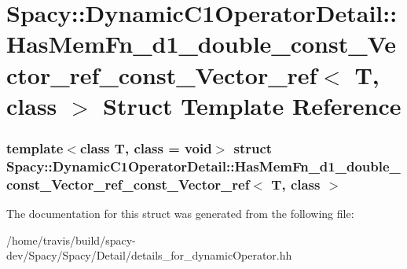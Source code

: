 \hypertarget{structSpacy_1_1DynamicC1OperatorDetail_1_1HasMemFn__d1__double__const__Vector__ref__const__Vector__ref}{\section{\-Spacy\-:\-:\-Dynamic\-C1\-Operator\-Detail\-:\-:\-Has\-Mem\-Fn\-\_\-d1\-\_\-double\-\_\-const\-\_\-\-Vector\-\_\-ref\-\_\-const\-\_\-\-Vector\-\_\-ref$<$ \-T, class $>$ \-Struct \-Template \-Reference}
\label{structSpacy_1_1DynamicC1OperatorDetail_1_1HasMemFn__d1__double__const__Vector__ref__const__Vector__ref}
}
\subsubsection*{template$<$class T, class = void$>$ struct Spacy\-::\-Dynamic\-C1\-Operator\-Detail\-::\-Has\-Mem\-Fn\-\_\-d1\-\_\-double\-\_\-const\-\_\-\-Vector\-\_\-ref\-\_\-const\-\_\-\-Vector\-\_\-ref$<$ T, class $>$}



\-The documentation for this struct was generated from the following file\-:\begin{DoxyCompactItemize}
\item 
/home/travis/build/spacy-\/dev/\-Spacy/\-Spacy/\-Detail/details\-\_\-for\-\_\-dynamic\-Operator.\-hh\end{DoxyCompactItemize}
